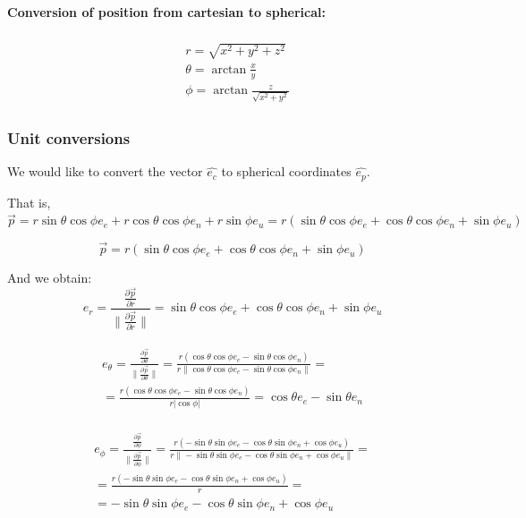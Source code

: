 \documentclass{article}
\newcommand{\east}{e_e}
\newcommand{\north}{e_n}
\newcommand{\up}{e_u}
\newcommand{\range}{e_r}
\newcommand{\bearing}{e_\theta}
\newcommand{\elevation}{e_\phi}
\newcommand{\carvec}{\hat{e_{c}}}
\newcommand{\polvec}{\hat{e_{p}}}
\begin{document}
\paragraph{Conversion of position from cartesian to spherical:}
\begin{align}\label{eq:polar-position}
\begin{split}
{}& r= \sqrt{x^2 + y^2 + z^2} \\
{}& \theta= \arctan \frac{x}{y} \\
{}& \phi = \arctan \frac{z}{\sqrt{x^2 + y^2}}
\end{split}
\end{align}

\subsubsection{Unit conversions}
 We would like to convert the vector $\carvec$ to spherical
coordinates $\polvec$.

That is, $\vec{p} = r\sin \theta \cos \phi \east + r\cos \theta \cos \phi \north +
r\sin \phi \up = r( \sin \theta \cos \phi \east + \cos \theta \cos \phi \north +
\sin \phi \up)$

\begin{equation}
\vec{p} = r( \sin \theta \cos \phi \east + \cos \theta \cos \phi \north +
\sin \phi \up)
\end{equation}

And we obtain:
\begin{equation}\label{eq:range}
\range = \frac{\frac{\partial \vec{p}}{\partial r}}{\| \frac{\partial
\vec{p}}{\partial r} \|} = \sin \theta \cos \phi \east + \cos \theta \cos \phi \north +
\sin \phi \up 
\end{equation}

\begin{align}\label{eq:bearing}
\begin{split}
\bearing = \frac{\frac{\partial \vec{p}}{\partial \theta}}{\| \frac{\partial
\vec{p}}{\partial \theta} \|} = \frac{r( \cos \theta \cos \phi \east - \sin
\theta \cos \phi \north) }{r \| \cos \theta \cos \phi \east - \sin \theta
\cos \phi \north\|} = \\
= \frac{r( \cos \theta \cos \phi \east - \sin \theta
\cos \phi \north) }{r |\cos \phi |} = \cos \theta \east - \sin \theta \north
\end{split}
\end{align}

\begin{align}
\begin{split}
\elevation = \frac{\frac{\partial \vec{p}}{\partial \phi}}{\| \frac{\partial
\vec{p}}{\partial \phi} \|} = \frac{r( - \sin \theta \sin \phi \east - \cos
\theta \sin \phi \north + \cos \phi \up) }{r \| - \sin \theta \sin \phi \east - \cos
\theta \sin \phi \north + \cos \phi \up \|} = \\
= \frac{r( - \sin \theta \sin \phi \east - \cos
\theta \sin \phi \north + \cos \phi \up) }{r} = \\
= - \sin \theta \sin \phi \east
- \cos \theta \sin \phi \north + \cos \phi \up
\end{split}
\end{align}
\end{document}
